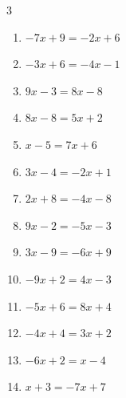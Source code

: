\begin{multicols}{3}
\begin{enumerate}
  \item $-7x+9=-2x+6$


  \item $-3x+6=-4x-1$

        \phantom{$\displaystyle x=-7$}

  \item $9x-3=8x-8$

        \phantom{$\displaystyle x=-5$}

  \item $8x-8=5x+2$


  \item $x-5=7x+6$


  \item $3x-4=-2x+1$

        \phantom{$\displaystyle x=1$}

  \item $2x+8=-4x-8$


  \item $9x-2=-5x-3$


  \item $3x-9=-6x+9$

        \phantom{$\displaystyle x=2$}

  \item $-9x+2=4x-3$


  \item $-5x+6=8x+4$


  \item $-4x+4=3x+2$


  \item $-6x+2=x-4$


\columnbreak %

  \item $x+3=-7x+7$


\end{enumerate}
\end{multicols}

